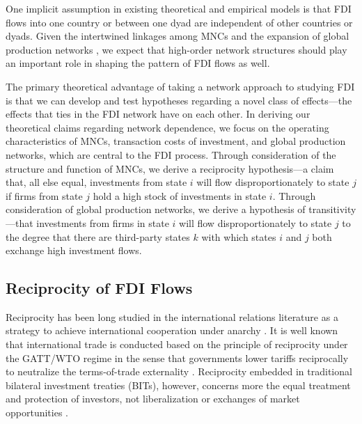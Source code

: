 \documentclass[reqno,onecolumn,letterpaper,12pt]{article}
\begin{document}
One implicit assumption in existing theoretical and empirical models is that FDI flows into one country or between one dyad are independent of other countries or dyads. %
Given the intertwined linkages among MNCs and the expansion of global production networks \citep{UNCTAD:2013,Baldwin:2011}, we expect that high-order network structures should play an important role in shaping the pattern of FDI flows as well.


The primary theoretical advantage of taking a network approach to studying FDI is that we can develop and test hypotheses regarding a novel class of effects---the effects that ties in the FDI network have on each other. In deriving our theoretical claims regarding network dependence, we focus on the operating characteristics of MNCs, transaction costs of investment, and global production networks, which are central to the FDI process. Through consideration of the structure and function of MNCs, we derive a reciprocity \citep{garlaschelli2004patterns} hypothesis---a claim that, all else equal, investments from state $i$ will flow disproportionately to state $j$ if firms from state $j$ hold a high stock of investments in state $i$. Through consideration of global production networks, we derive a hypothesis of transitivity \citep{holland1971transitivity}---that investments from firms in state $i$ will flow disproportionately to state $j$ to the degree that there are third-party states $k$ with which states $i$ and $j$ both exchange high investment flows.

\subsection{Reciprocity of FDI Flows}
Reciprocity has been long studied in the international relations literature as a strategy to achieve international cooperation under anarchy \citep[e.g.,][]{Axelrod:1984,Keohane:1984}. It is well known that international trade is conducted based on the principle of reciprocity under the GATT/WTO regime in the sense that governments lower tariffs reciprocally to neutralize the terms-of-trade externality \citep{Bagwell_Staiger:1999}. Reciprocity embedded in traditional bilateral investment treaties (BITs), however, concerns more the equal treatment and protection of investors, not liberalization or exchanges of market opportunities \citep[~56]{DiMascio_Pauwelyn:2008}.
\end{document}
